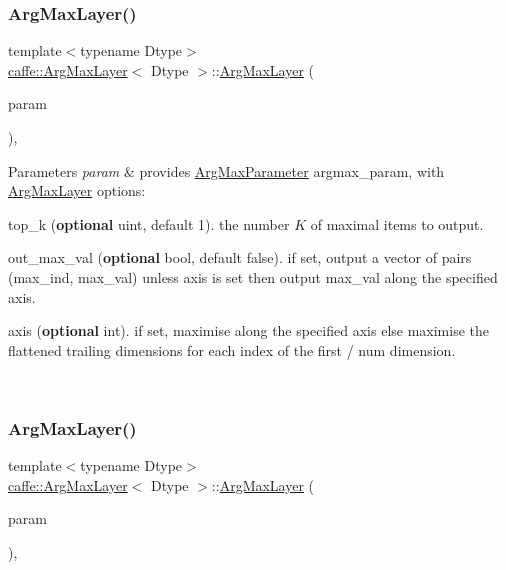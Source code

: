 \subsubsection{\texorpdfstring{Arg\+Max\+Layer()}{ArgMaxLayer()}\hspace{0.1cm}{\footnotesize\ttfamily [1/2]}}
{\footnotesize\ttfamily template$<$typename Dtype$>$ \\
\mbox{\hyperlink{classcaffe_1_1_arg_max_layer}{caffe\+::\+Arg\+Max\+Layer}}$<$ Dtype $>$\+::\mbox{\hyperlink{classcaffe_1_1_arg_max_layer}{Arg\+Max\+Layer}} (\begin{DoxyParamCaption}\item[{const \mbox{\hyperlink{classcaffe_1_1_layer_parameter}{Layer\+Parameter}} \&}]{param }\end{DoxyParamCaption})\hspace{0.3cm}{\ttfamily [inline]}, {\ttfamily [explicit]}}


\begin{DoxyParams}{Parameters}
{\em param} & provides \mbox{\hyperlink{classcaffe_1_1_arg_max_parameter}{Arg\+Max\+Parameter}} argmax\+\_\+param, with \mbox{\hyperlink{classcaffe_1_1_arg_max_layer}{Arg\+Max\+Layer}} options\+:
\begin{DoxyItemize}
\item top\+\_\+k ({\bfseries optional} uint, default 1). the number $ K $ of maximal items to output.
\item out\+\_\+max\+\_\+val ({\bfseries optional} bool, default false). if set, output a vector of pairs (max\+\_\+ind, max\+\_\+val) unless axis is set then output max\+\_\+val along the specified axis.
\item axis ({\bfseries optional} int). if set, maximise along the specified axis else maximise the flattened trailing dimensions for each index of the first / num dimension. 
\end{DoxyItemize}\\
\hline
\end{DoxyParams}
\mbox{\label{classcaffe_1_1_arg_max_layer_a77429601f3d7f27b48720a1b703491be}} 
\subsubsection{\texorpdfstring{Arg\+Max\+Layer()}{ArgMaxLayer()}\hspace{0.1cm}{\footnotesize\ttfamily [2/2]}}
{\footnotesize\ttfamily template$<$typename Dtype$>$ \\
\mbox{\hyperlink{classcaffe_1_1_arg_max_layer}{caffe\+::\+Arg\+Max\+Layer}}$<$ Dtype $>$\+::\mbox{\hyperlink{classcaffe_1_1_arg_max_layer}{Arg\+Max\+Layer}} (\begin{DoxyParamCaption}\item[{const \mbox{\hyperlink{classcaffe_1_1_layer_parameter}{Layer\+Parameter}} \&}]{param }\end{DoxyParamCaption})\hspace{0.3cm}{\ttfamily [inline]}, {\ttfamily [explicit]}}



